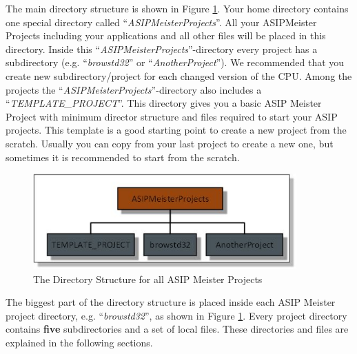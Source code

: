 The main directory structure is shown in Figure \ref{fig:fig21}. Your home directory contains one
special directory called ``\emph{ASIPMeisterProjects}''. All your
ASIPMeister Projects including your applications and all other files
will be placed in this directory. Inside this
``\emph{ASIPMeisterProjects}''-directory every project has a
subdirectory (e.g. ``\emph{browstd32}'' or ``\emph{AnotherProject}'').
We recommended that you create new subdirectory/project for each changed
version of the CPU. Among the projects the
``\emph{ASIPMeisterProjects}''-directory also includes a
``\emph{TEMPLATE\_PROJECT}''. This directory gives you a basic ASIP
Meister Project with minimum director structure and files required to
start your ASIP projects. This template is a good starting point to
create a new project from the scratch. Usually you can copy from your
last project to create a new one, but sometimes it is recommended to
start from the scratch.
\begin{figure}[!htb]
	\centering
	\includegraphics[width=0.9\textwidth]{src/images/2-1.png}
	\caption{ The Directory Structure for all ASIP Meister Projects}
	\label{fig:fig21}
\end{figure}
The biggest part of the directory structure is placed inside each ASIP
Meister project directory, e.g. ``\emph{browstd32}'', as shown in Figure
\ref{fig:fig21}. Every project directory contains
\textbf{five} subdirectories and a set of local files. These directories
and files are explained in the following sections.

